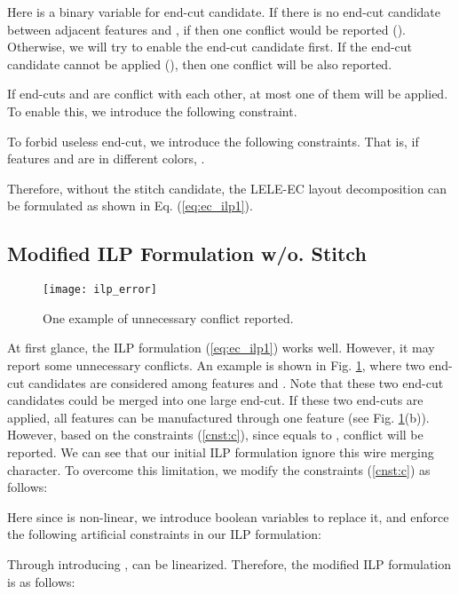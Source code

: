\documentclass[12pt]{spieman}
\theoremstyle{plain}
\begin{document}
\begin{spacing}{1}
Here  is a binary variable for end-cut candidate.
If there is no end-cut candidate between adjacent features  and , if  then one conflict would be reported ().
Otherwise, we will try to enable the end-cut candidate  first.
If the end-cut candidate  cannot be applied (), then one conflict will be also reported.

If end-cuts  and  are conflict with each other, at most one of them will be applied.
To enable this, we introduce the following constraint.


To forbid useless end-cut, we introduce the following constraints.
That is, if features  and  are in different colors, .


Therefore, without the stitch candidate, the LELE-EC layout decomposition can be formulated as shown in Eq. (\ref{eq:ec_ilp1}).




\iffalse
\subsection{Modified ILP Formulation w/o. Stitch}


\begin{figure}[htb]
  \centering
  \texttt{[image: ilp\_error]}
  \caption{One example of unnecessary conflict reported.}
  \label{fig:ilp_error}
\end{figure}

At first glance, the ILP formulation (\ref{eq:ec_ilp1}) works well.
However, it may report some unnecessary conflicts.
An example is shown in Fig. \ref{fig:ilp_error}, where two end-cut candidates  are considered among features  and .
Note that these two end-cut candidates could be merged into one large end-cut.
If these two end-cuts are applied, all features can be manufactured through one feature (see Fig. \ref{fig:ilp_error}(b)).
However, based on the constraints (\ref{cnst:c}), since  equals to , conflict  will be reported.
We can see that our initial ILP formulation ignore this wire merging character.
To overcome this limitation, we modify the constraints (\ref{cnst:c}) as follows:

Here since  is non-linear, we introduce boolean variables  to replace it, and enforce the following artificial constraints in our ILP formulation:


Through introducing ,  can be linearized.
Therefore, the modified ILP formulation is as follows:

\begin{figure}[h]
\centering


\end{figure}
\end{spacing}
\end{document}
